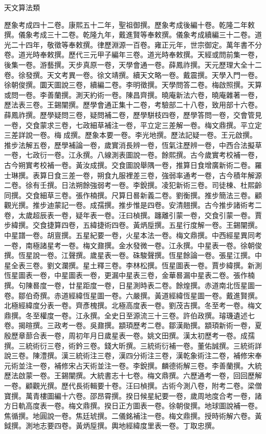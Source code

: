 \begin{pinyinscope}
天文算法類

歷象考成四十二卷。康熙五十二年，聖祖御撰。歷象考成後編十卷。乾隆二年敕撰。儀象考成三十二卷。乾隆九年，戴進賢等奉敕撰。儀象考成續編三十二卷。道光二十四年，敬徵等奉敕撰。律歷淵源一百卷。雍正元年，世宗御定。萬年書不分卷。道光時奉敕撰。歷代三元甲子編年三卷。道光時奉敕撰。天經或問前集一卷，後集一卷。游藝撰。天步真原一卷，天學會通一卷。薛鳳祚撰。天元歷理大全十二卷。徐發撰。天文考異一卷。徐文靖撰。續天文略一卷。戴震撰。天學入門一卷。徐朝俊撰。圜天圖說三卷，續編二卷。李明徵撰。天學問答二卷。梅啟照撰。天算或問一卷。李善蘭撰。測天約術一卷。陳昌齊撰。曉庵新法六卷，曉庵雜著一卷，歷法表三卷。王錫闡撰。歷學會通正集十二卷，考驗部二十八卷，致用部十六卷。薛鳳祚撰。歷學疑問三卷，疑問補二卷，歷學駢枝四卷，歷學答問一卷，交會管見一卷，交食蒙求三卷，七政細草補注一卷，平立定三差解一卷。梅文鼎撰。平立定三差詳說一卷。梅成撰。歷象本要一卷。李光地撰。歷法記疑一卷。王元啟撰。推步法解五卷，歷學補論一卷，歲實消長辨一卷，恆氣注歷辨一卷，中西合法擬草一卷，七政衍一卷。江永撰。八線測表圖說一卷。餘熙撰。古今歲實考校補一卷，古今朔實考校補一卷。黃汝成撰。交食圖說舉隅一卷，推算日食增廣新術二卷。羅士琳撰。表算日食三差一卷，朔食九服裡差三卷，強弱率通考一卷，古今積年解源二卷。徐有壬撰。日法朔餘強弱考一卷。李銳撰。凌犯新術三卷。司徒棟、杜熙齡同撰。交食細草三卷。張作楠撰。尺算日晷新義二卷。劉衡撰。推步簡法三卷。顧觀光撰。推步迪蒙記一卷。成孺撰。推步惟是四卷。安清翹撰。古今推步諸術考二卷，太歲超辰表一卷，疑年表一卷。汪曰楨撰。躔離引蒙一卷，交食引蒙一卷。賈步緯撰。交食捷算四卷，五緯捷術四卷。黃炳垕撰。五星行度解一卷。王錫闡撰。中星譜一卷。胡亶撰。五星紀要一卷，火星本法一卷。梅文鼎撰。中西經星異同考一卷，南極諸星考一卷。梅文鼐撰。金水發微一卷。江永撰。中星表一卷。徐朝俊撰。恆星說一卷。江聲撰。歲星表一卷。硃駿聲撰。恆星餘論一卷。張星江撰。中星全表三卷。劉文瀾撰。星土釋三卷。李林松撰。恆星圖表一卷。賈步緯撰。新測恆星圖表一卷，中星圖表一卷，更漏中星表三卷，金華晷漏中星表二卷。張作楠撰。句陳晷度一卷，廿星距度一卷，日星測時表二卷。餘煌撰。赤道南北恆星圖一卷。鄒伯奇撰。赤道經緯恆星圖一卷。六嚴撰。黃道經緯恆星圖一卷。戴進賢撰。北極經緯度分表一卷。齊彥槐撰。北極高度表一卷。劉茂吉撰。冬至考一卷。梅文鼎撰。冬至權度一卷。江永撰。全史日至源流三十三卷。許伯政撰。璿璣遺述七卷。揭暄撰。三政考一卷。吳鼐撰。顓頊歷考二卷。鄒漢勛撰。顓頊新術一卷，夏殷歷章蔀合表一卷，周初年月日歲星表一卷。姚文田撰。漢太初歷考一卷。成孺撰。三統術衍三卷，術鈐三卷。錢大昕撰。三統術衍補一卷。董佑誠撰。三統術詳說三卷。陳澧撰。漢三統術注三卷，漢四分術注三卷，漢乾象術注二卷，補修宋奉元術並注一卷，補修宋占天術並注一卷。李銳撰。麟德術解三卷。李善蘭撰。大統歷法啟蒙一卷。王錫闡撰。大統書志十七卷。梅文鼎撰。六歷通考一卷，回回歷解一卷。顧觀光撰。歷代長術輯要十卷。汪曰楨撰。古術今測八卷，附考二卷。梁僧寶撰。萬青樓圖編十六卷。邵昂霄撰。揆日候星紀要一卷，歲周地度合考一卷，諸方日軌高度表一卷。梅文鼎撰。揆日正方圖表一卷。徐朝俊撰。地球圖說補一卷。焦循撰。地圓說一卷。焦廷琥撰。二儀銘補注一卷。梅文鼎撰。授時術解六卷。黃鉞撰。測地志要四卷。黃炳垕撰。輿地經緯度里表一卷。丁取忠撰。


\end{pinyinscope}
